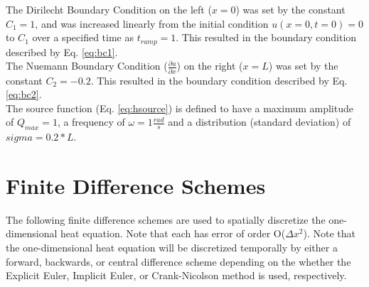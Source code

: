 \documentclass[10pt, letter, showtrims]{extarticle}
\begin{document}
		\noindent
		The Dirilecht Boundary Condition on the left ($x = 0$) was set by the constant $C_{1} = 1$, and was increased linearly from the initial condition $u(x = 0, t = 0) = 0$ to $C_{1}$ over a specified time as $t_{ramp} = 1$. This resulted in the boundary condition described by Eq. \ref{eq:bc1}. \\
		
		\noindent
		The Nuemann Boundary Condition ($\frac{\partial u}{\partial x}$) on the right ($x = L$) was set by the constant  $C_{2} = -0.2$. This resulted in the boundary condition described by Eq. \ref{eq:bc2}. \\
		
		\noindent
		The source function (Eq. \ref{eq:hsource}) is defined to have a maximum amplitude of $Q_{max} = 1$, a frequency of $\omega = 1 \frac{rad}{s}$ and a distribution (standard deviation) of $sigma = 0.2 * L$.
%		
%		
		\FloatBarrier
		\begin{table}[h]
			\caption{Heat Equation Parameters and Boundary Conditions}
			\label{tbl:parameters}
			\centering
		\end{table}
		\FloatBarrier
		
		\section{Finite Difference Schemes}
		
		\noindent
		The following finite difference schemes are used to spatially discretize the one-dimensional heat equation. Note that each has error of order O($\Delta x^{2}$). Note that the one-dimensional heat equation will be discretized temporally by either a forward, backwards, or central difference scheme depending on the whether the Explicit Euler, Implicit Euler, or Crank-Nicolson method is used, respectively. \\
		
\end{document}
